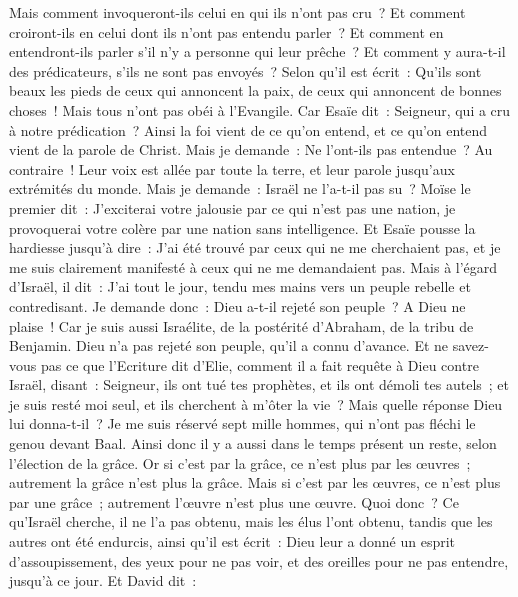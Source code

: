 \begin{multicols}{2}
Mais comment invoqueront-ils celui en qui ils n'ont pas cru~? Et comment croiront-ils en celui dont ils n'ont pas entendu parler~? Et comment en entendront-ils parler s'il n'y a personne qui leur prêche~?
Et comment y aura-t-il des prédicateurs, s'ils ne sont pas envoyés~? Selon qu'il est écrit~: Qu'ils sont beaux les pieds de ceux qui annoncent la paix, de ceux qui annoncent de bonnes choses~!
Mais tous n'ont pas obéi à l'Evangile. Car Esaïe dit~: Seigneur, qui a cru à notre prédication~?
Ainsi la foi vient de ce qu'on entend, et ce qu'on entend vient de la parole de Christ.
Mais je demande~: Ne l'ont-ils pas entendue~? Au contraire~! Leur voix est allée par toute la terre, et leur parole jusqu'aux extrémités du monde.
Mais je demande~: Israël ne l'a-t-il pas su~? Moïse le premier dit~: J'exciterai votre jalousie par ce qui n'est pas une nation, je provoquerai votre colère par une nation sans intelligence.
Et Esaïe pousse la hardiesse jusqu'à dire~: J'ai été trouvé par ceux qui ne me cherchaient pas, et je me suis clairement manifesté à ceux qui ne me demandaient pas.
Mais à l'égard d'Israël, il dit~: J'ai tout le jour, tendu mes mains vers un peuple rebelle et contredisant.
\VerseOne{}Je demande donc~: Dieu a-t-il rejeté son peuple~? A Dieu ne plaise~! Car je suis aussi Israélite, de la postérité d'Abraham, de la tribu de Benjamin.
Dieu n'a pas rejeté son peuple, qu'il a connu d'avance. Et ne savez-vous pas ce que l'Ecriture dit d'Elie, comment il a fait requête à Dieu contre Israël, disant~:
Seigneur, ils ont tué tes prophètes, et ils ont démoli tes autels~; et je suis resté moi seul, et ils cherchent à m'ôter la vie~?
Mais quelle réponse Dieu lui donna-t-il~? Je me suis réservé sept mille hommes, qui n'ont pas fléchi le genou devant Baal.
Ainsi donc il y a aussi dans le temps présent un reste, selon l'élection de la grâce.
Or si c'est par la grâce, ce n'est plus par les œuvres~; autrement la grâce n'est plus la grâce. Mais si c'est par les œuvres, ce n'est plus par une grâce~; autrement l'œuvre n'est plus une œuvre.
Quoi donc~? Ce qu'Israël cherche, il ne l'a pas obtenu, mais les élus l'ont obtenu, tandis que les autres ont été endurcis,
ainsi qu'il est écrit~: Dieu leur a donné un esprit d'assoupissement, des yeux pour ne pas voir, et des oreilles pour ne pas entendre, jusqu'à ce jour. Et David dit~:

\end{multicols}

